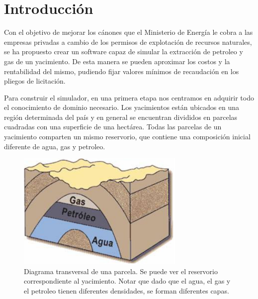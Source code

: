 \documentclass[10pt,a4paper]{article}
\begin{document}
{} %

\grupo{}



\maketitle

\tableofcontents

\pagebreak

\section{Introducción}

Con el objetivo de mejorar los cánones que el Ministerio de Energía le cobra a las empresas privadas a cambio de los permisos de explotación de recursos naturales, se ha propuesto crear un software capaz de simular la extracción de petroleo y gas de un yacimiento. De esta manera se pueden aproximar los costos y la rentabilidad del mismo, pudiendo fijar valores mínimos de recaudación en los pliegos de licitación.

Para construir el simulador, en una primera etapa nos centramos en adquirir todo el conocimiento de dominio necesario. Los yacimientos están ubicados en una región determinada del país y en general se encuentran divididos en parcelas cuadradas con una superficie de una hectárea. Todas las parcelas de un yacimiento comparten un mismo reservorio, que contiene una composición inicial diferente de agua, gas y petroleo.

\begin{figure}[H]
\centering
\includegraphics[scale=0.6]{images/yacimiento.png}
\caption{Diagrama transversal de una parcela. Se puede ver el reservorio correspondiente al yacimiento. Notar que dado que el agua, el gas y el petroleo tienen diferentes densidades, se forman diferentes capas.}
\end{figure}
\end{document}
